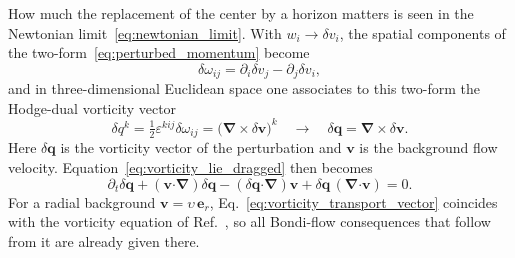 \documentclass[12pt,a4paper,preprint,nopreprintline]{elsarticle}
\begin{document}
How much the replacement of the center by a horizon matters is seen in the Newtonian limit~\eqref{eq:newtonian_limit}. With $w_{i}\rightarrow\delta v_{i}$, the spatial components of the two-form~\eqref{eq:perturbed_momentum} become
\begin{equation}
    \delta\omega_{ij}
    =
    \partial_{i}\delta v_{j}
    -
    \partial_{j}\delta v_{i},
    \label{eq:vorticity_newtonian_components}
\end{equation}
and in three-dimensional Euclidean space one associates to this two-form the Hodge-dual vorticity vector
\begin{equation}
    \delta q^{k}
    =
    \tfrac{1}{2}\varepsilon^{kij}\delta\omega_{ij}
    =
    \bigl(\boldsymbol{\nabla}\times\delta\boldsymbol{v}\bigr)^{k}
    \quad\to\quad
    \delta\boldsymbol{q}
    =
    \boldsymbol{\nabla}\times\delta\boldsymbol{v}.
    \label{eq:vorticity_newtonian}
\end{equation}
Here $\delta\boldsymbol{q}$ is the vorticity vector of the perturbation and $\boldsymbol{v}$ is the background flow velocity. Equation~\eqref{eq:vorticity_lie_dragged} then becomes
\begin{equation}
    \partial_{t}\delta\boldsymbol{q}
    +
    (\boldsymbol{v}\boldsymbol{\cdot}\boldsymbol{\nabla})
        \delta\boldsymbol{q}
    -
    (\delta\boldsymbol{q}\boldsymbol{\cdot}\boldsymbol{\nabla})
        \boldsymbol{v}
    +
    \delta\boldsymbol{q}\,
        (\boldsymbol{\nabla}\boldsymbol{\cdot}\boldsymbol{v})
    =0.
    \label{eq:vorticity_transport_vector}
\end{equation}
For a radial background $\boldsymbol{v}=\upsilon\,\boldsymbol{e}_{r}$, Eq.~\eqref{eq:vorticity_transport_vector} coincides with the vorticity equation of Ref.~\cite{KovalenkoIG_EreminMA_SpatialInstabilityOfSphericalAccretion_1998}, so all Bondi-flow consequences that follow from it are already given there.
\end{document}
